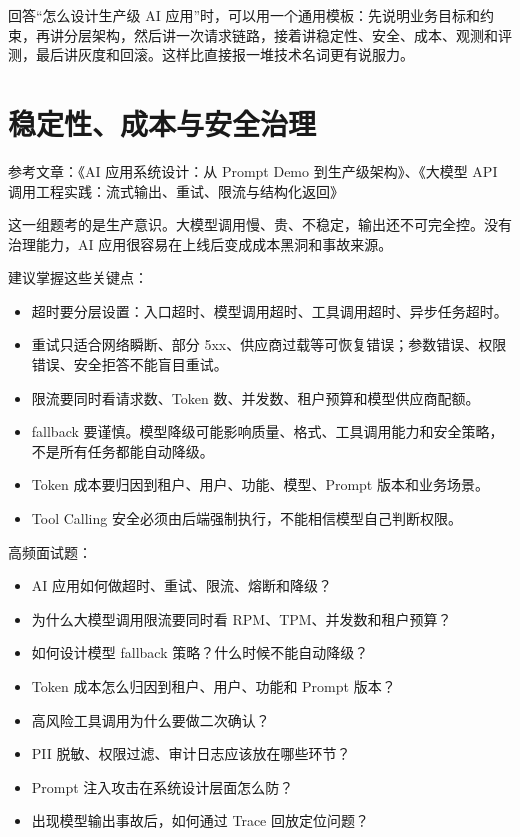 \documentclass[10pt,a4paper]{ctexart}
\begin{document}
回答“怎么设计生产级 AI 应用”时，可以用一个通用模板：先说明业务目标和约束，再讲分层架构，然后讲一次请求链路，接着讲稳定性、安全、成本、观测和评测，最后讲灰度和回滚。这样比直接报一堆技术名词更有说服力。



\section{稳定性、成本与安全治理}


参考文章：《AI 应用系统设计：从 Prompt Demo 到生产级架构》、《大模型 API 调用工程实践：流式输出、重试、限流与结构化返回》



这一组题考的是生产意识。大模型调用慢、贵、不稳定，输出还不可完全控。没有治理能力，AI 应用很容易在上线后变成成本黑洞和事故来源。



建议掌握这些关键点：


\begin{itemize}[itemsep=2pt, topsep=4pt]
  \item 超时要分层设置：入口超时、模型调用超时、工具调用超时、异步任务超时。
  \item 重试只适合网络瞬断、部分 5xx、供应商过载等可恢复错误；参数错误、权限错误、安全拒答不能盲目重试。
  \item 限流要同时看请求数、Token 数、并发数、租户预算和模型供应商配额。
  \item fallback 要谨慎。模型降级可能影响质量、格式、工具调用能力和安全策略，不是所有任务都能自动降级。
  \item Token 成本要归因到租户、用户、功能、模型、Prompt 版本和业务场景。
  \item Tool Calling 安全必须由后端强制执行，不能相信模型自己判断权限。
\end{itemize}


高频面试题：


\begin{itemize}[itemsep=2pt, topsep=4pt]
  \item AI 应用如何做超时、重试、限流、熔断和降级？
  \item 为什么大模型调用限流要同时看 RPM、TPM、并发数和租户预算？
  \item 如何设计模型 fallback 策略？什么时候不能自动降级？
  \item Token 成本怎么归因到租户、用户、功能和 Prompt 版本？
  \item 高风险工具调用为什么要做二次确认？
  \item PII 脱敏、权限过滤、审计日志应该放在哪些环节？
  \item Prompt 注入攻击在系统设计层面怎么防？
  \item 出现模型输出事故后，如何通过 Trace 回放定位问题？
\end{itemize}
\end{document}
